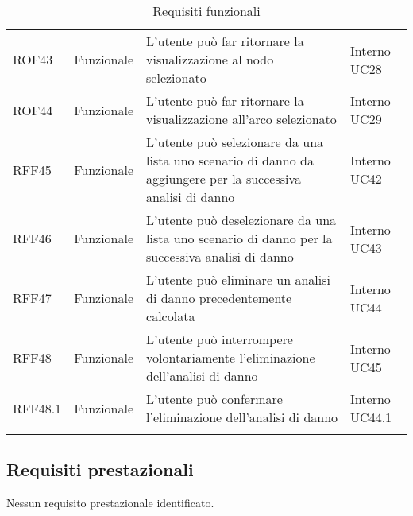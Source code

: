 \begin{longtable}{p{2cm}!{\VRule[1pt]}p{2cm}!{\VRule[1pt]}p{5cm}!{\VRule[1pt]}p{1.5cm}}
	\\
	ROF43                            & Funzionale\newline               & L'utente può far ritornare la visualizzazione al nodo selezionato                                                        & Interno \newline UC28        
	\\
	ROF44                            & Funzionale\newline               & L'utente può far ritornare la visualizzazione all'arco selezionato                                                       & Interno \newline UC29        
	\\
	RFF45                            & Funzionale\newline               & L'utente può  selezionare da una lista uno scenario di danno da aggiungere per la successiva analisi di danno            & Interno \newline UC42        
	\\
	RFF46                            & Funzionale\newline               & L'utente può deselezionare da una lista uno scenario di danno per la successiva analisi di danno                         & Interno \newline UC43        
	\\
	RFF47                            & Funzionale\newline               & L'utente può eliminare un analisi di danno precedentemente calcolata                                                     & Interno \newline UC44        
	\\
	RFF48                            & Funzionale\newline               & L'utente può interrompere volontariamente l'eliminazione dell'analisi di danno                                           & Interno \newline UC45        
	\\
	RFF48.1                          & Funzionale\newline               & L'utente può confermare l'eliminazione dell'analisi di danno                                                             & Interno \newline UC44.1      
	\\
	\caption{Requisiti funzionali}
\end{longtable}
\subsection{Requisiti prestazionali}
Nessun requisito prestazionale identificato.
